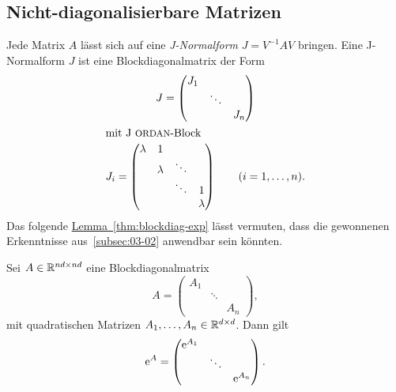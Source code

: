 \subsection{Nicht-diagonalisierbare Matrizen}\label{subsec:03-03}
Jede Matrix $A$ lässt sich auf eine \emph{J-Normalform} $J = V^{-1} A V$ bringen.
Eine J-Normalform $J$ ist eine Blockdiagonalmatrix der Form
\begin{gather*}
    J = \begin{pmatrix}
            J_1 &        &  \\
                & \ddots & \\
                &        & J_n
    \end{pmatrix}\\
    \intertext{mit J\textc{ordan}-Block}
    J_i = \begin{pmatrix}
              \lambda & 1       &        & \\
                      & \lambda & \ddots & \\
                      &         & \ddots & 1 \\
                      &         &        & \lambda
    \end{pmatrix}
    \qquad (i = 1,\dots,n).
\end{gather*}
Das folgende \hyperref[thm:blockdiag-exp]{Lemma~\ref*{thm:blockdiag-exp}} lässt vermuten,
dass die gewonnenen Erkenntnisse aus~\autoref{subsec:03-02} anwendbar sein könnten.

\begin{lemma}\label{thm:blockdiag-exp}
    Sei $A \in \mathbb{R}^{nd \times nd}$ eine Blockdiagonalmatrix
    \begin{equation*}
        A = \begin{pmatrix}
                A_1 &        & \\
                    & \ddots & \\
                    &        & A_n
        \end{pmatrix},
    \end{equation*}
    mit quadratischen Matrizen $A_1, \dots, A_n \in \mathbb{R}^{d \times d}$.
    Dann gilt
    \begin{equation*}
        \mathrm{e}^A = \begin{pmatrix}
                   \mathrm{e}^{A_1} &        & \\
                            & \ddots & \\
                            &        & \mathrm{e}^{A_n}
        \end{pmatrix}.
    \end{equation*}
\end{lemma}

